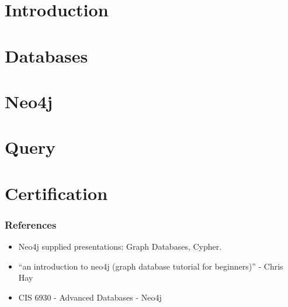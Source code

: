 \section[Intro]{Introduction}



\section[Db]{Databases}


\section[Neo4j]{Neo4j}


\section[Query]{Query}


\section[Cert]{Certification}


\begin{frame}\frametitle{References}
\begin{itemize}
\item Neo4j supplied presentations: Graph Databases, Cypher.
\item ``an introduction to neo4j (graph database tutorial for beginners)'' - Chris Hay
\item CIS 6930 - Advanced Databases - Neo4j 
\end{itemize}
\end{frame}